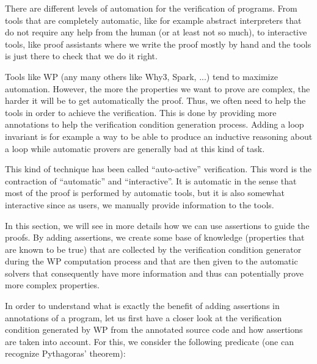 There are different levels of automation for the verification of programs. From
tools that are completely automatic, like for example abstract interpreters that
do not require any help from the human (or at least not so much), to interactive
tools, like proof assistants where we write the proof mostly by hand and the
tools is just there to check that we do it right.



Tools like WP (any many others like Why3, Spark, ...) tend to maximize
automation. However, the more the properties we want to prove are complex, the
harder it will be to get automatically the proof. Thus, we often need to help
the tools in order to achieve the verification. This is done by providing more
annotations to help the verification condition generation process. Adding a loop
invariant is for example a way to be able to produce an inductive reasoning
about a loop while automatic provers are generally bad at this kind of task.



This kind of technique has been called ``auto-active'' verification. This word
is the contraction of ``automatic'' and ``interactive''. It is automatic in the
sense that most of the proof is performed by automatic tools, but it is also
somewhat interactive since as users, we manually provide information to the
tools.



In this section, we will see in more details how we can use assertions to guide
the proofs. By adding assertions, we create some base of knowledge (properties
that are known to be true) that are collected by the verification condition
generator during the WP computation process and that are then given to the
automatic solvers that consequently have more information and thus can
potentially prove more complex properties.






In order to understand what is exactly the benefit of adding assertions in
annotations of a program, let us first have a closer look at the verification
condition generated by WP from the annotated source code and how assertions are
taken into account. For this, we consider the following predicate (one can
recognize Pythagoras' theorem):






